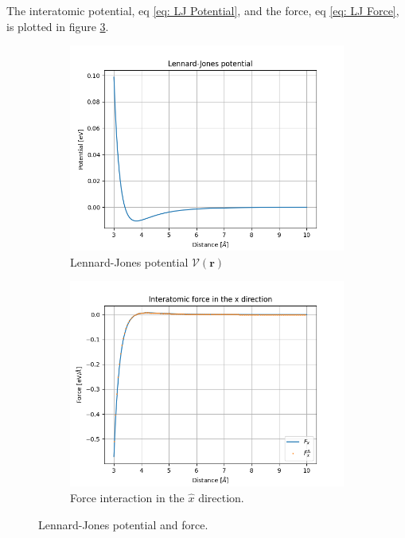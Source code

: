 \documentclass[a4paper]{article}
\begin{document}
The interatomic potential, eq \eqref{eq: LJ Potential}, and the force, eq \eqref{eq: LJ Force}, is plotted in figure \ref{fig: Interatomic potential and force}.
\begin{figure}[H]
    \centering
    \begin{subfigure}[b]{0.45\textwidth}
        \centering
        \includegraphics[width=\textwidth]{Lennard-Jones potential.png}
        \caption{Lennard-Jones potential $\mathcal{V}(\mathbf{r})$}
        \label{fig: Interatomic potential}
    \end{subfigure}
    \hfill
    \begin{subfigure}[b]{0.45\textwidth}
        \centering
        \includegraphics[width=\textwidth]{Interatomic force in the x direction.png}
        \caption{Force interaction in the $\hat{x}$ direction.}
        \label{fig:Interatomic force}
    \end{subfigure}
    \caption{Lennard-Jones potential and force.}
    \label{fig: Interatomic potential and force}
\end{figure}\noindent
\end{document}
